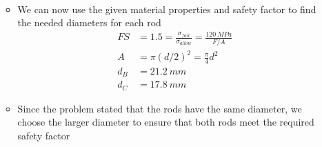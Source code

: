 \documentclass[12pt, oneside]{article}
\begin{document}
\begin{enumerate}
\begin{itemize}
\begin{align*}
			\end{align*}
		\item We can now use the given material properties and safety factor to find the needed diameters for each rod
			\begin{align*}
				FS &= 1.5 = \frac{\sigma_{fail}}{\sigma_{allow}} = \frac{\SI{120}{MPa}}{F/A}\\
				A &= \pi (d/2)^2 = \frac{\pi}{4}d^2\\
				d_B &= \SI{21.2}{mm}\\
				d_C &= \SI{17.8}{mm}
			\end{align*}
		\item Since the problem stated that the rods have the same diameter, we choose the larger diameter to ensure that both rods meet the required safety factor
		\end{itemize}


\end{enumerate}
\end{document}
